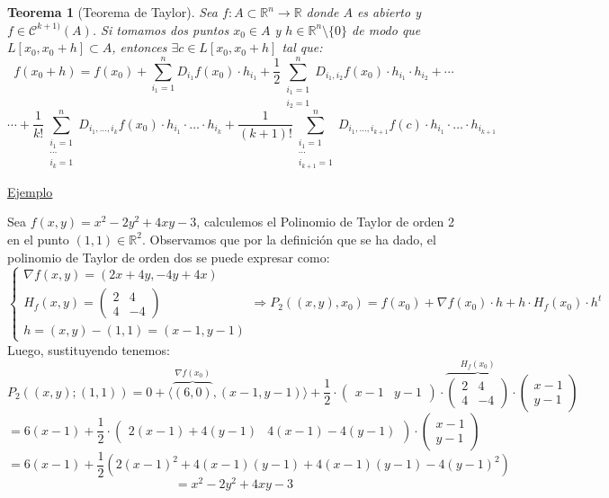 \documentclass[10pt,a4paper,openright]{book}
\theoremstyle{break}
\newtheorem*{theo}{Teorema}
\begin{document}
\begin{theo}[Teorema de Taylor]
Sea $f: A \subset \mathbb{R}^n \to \mathbb{R}$ donde $A$ es abierto y $f\in \mathcal{C}^{k+1)} (A)$. Si tomamos dos puntos $x_0 \in A$ y $h \in \mathbb{R}^n \setminus \{0\}$ de modo que $L[x_0,x_0 + h] \subset A$, entonces $\exists c \in L[x_0, x_0 + h]$ tal que:
$$f(x_0 + h) = f(x_0) + \sum_{i_1=1}^{n} D_{i_1} f(x_0) \cdot h_{i_1} + \frac{1}{2} \sum_{\substack{i_1 = 1 \\ i_2 = 1}}^{n} D_{i_1, i_2} f(x_0) \cdot h_{i_1} \cdot h_{i_2} + \cdots$$
$$\cdots + \frac{1}{k!} \sum_{\substack{i_1 = 1 \\ \cdots \\ i_k = 1}}^{n} D_{i_1, \ldots, i_k} f(x_0) \cdot h_{i_1} \cdot \ldots \cdot h_{i_k} + \frac{1}{(k+1)!} \sum_{\substack{i_1 = 1 \\ \cdots \\ i_{k+1} = 1}}^{n} D_{i_1, \ldots, i_{k+1}} f(c) \cdot h_{i_1} \cdot \ldots \cdot h_{i_{k+1}}$$
\end{theo}

\underline{Ejemplo}

Sea $f(x,y) = x^2 - 2y^2 + 4xy - 3$, calculemos el Polinomio de Taylor de orden 2 en el punto $(1,1) \in \mathbb{R}^2$. Observamos que por la definición que se ha dado, el polinomio de Taylor de orden dos se puede expresar como:
$$\begin{cases} \nabla f(x,y) = (2x + 4y, -4y + 4x) \\ H_f (x,y) =\begin{pmatrix} 2 & 4 \\ 4 & -4 \end{pmatrix} \\ h = (x,y) - (1,1) = (x-1, y-1) \end{cases} \Rightarrow P_2\left((x,y), x_0\right) = f(x_0) + \nabla f(x_0) \cdot h + h \cdot H_f(x_0) \cdot h^t$$
Luego, sustituyendo tenemos:
$$P_2((x,y); (1,1)) = 0 + \langle \overbrace{(6,0)}^{\nabla f(x_0)},(x-1, y-1) \rangle + \frac{1}{2} \cdot \begin{pmatrix}
x-1 & y-1
\end{pmatrix} \cdot \overbrace{\begin{pmatrix}
2 & 4 \\ 4 & -4
\end{pmatrix}}^{H_f(x_0)} \cdot \begin{pmatrix}
x-1 \\ y-1
\end{pmatrix} $$
$$= 6(x-1) + \frac{1}{2} \cdot \begin{pmatrix}
2(x-1) + 4 (y-1) & 4(x-1) - 4 (y-1)
\end{pmatrix}\cdot \begin{pmatrix}
x-1 \\ y-1
\end{pmatrix} $$
$$= 6(x-1) + \frac{1}{2} \left( 2 (x-1)^2 + 4 (x-1)(y-1) + 4 (x-1)(y-1) - 4 (y-1)^2 \right)$$
$$= x^2 - 2y^2 + 4xy - 3$$
\end{document}
